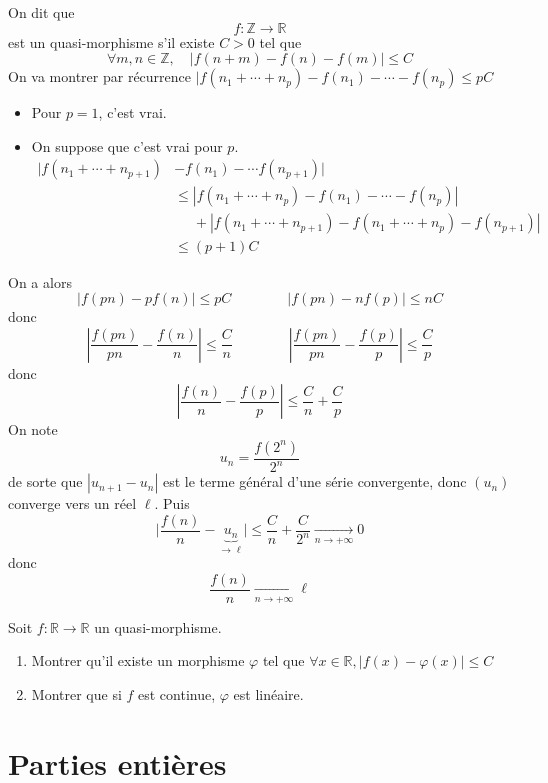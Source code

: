 \begin{ex}
    On dit que \[
        f:\mathbb Z\longrightarrow\mathbb R
    \]
    est un quasi-morphisme s'il existe $C>0$ tel que \[
        \forall m,n\in\mathbb Z, \quad |f(n+m)-f(n)-f(m)|\leq C
    \]
    On va montrer par récurrence $|f(n_1+\cdots +n_p)-f(n_1)-\cdots -f(n_p)\leq pC$
    \begin{itemize}
        \item Pour $p=1$, c'est vrai.
        \item On suppose que c'est vrai pour $p$. \begin{align*}
                |f(n_1+\cdots +n_{p+1})&-f(n_1)-\cdots f(n_{p+1})|\\ &\leq |f(n_1+\cdots+n_{p})-f(n_1)-\cdots-f(n_p)|\\&\phantom{\leq }+|f(n_1+\cdots+n_{p+1})-f(n_1+\cdots +n_p)-f(n_{p+1})|\\&\leq (p+1)C
            \end{align*}
    \end{itemize}
    On a alors \[
        |f(pn)-pf(n)|\leq pC\qquad \qquad |f(pn)-nf(p)|\leq nC
    \]
    donc \[
        \left| \frac{f(pn)}{pn}-\frac{f(n)}n \right|\leq \frac Cn\qquad \qquad \left| \frac{f(pn)}{pn}-\frac{f(p)}p \right|\leq \frac Cp
    \]
    donc \[
        \left| \frac{f(n)}n-\frac{f(p)}p \right|\leq \frac Cn+\frac Cp
    \]
    On note \[
        u_n=\frac{f(2^n)}{2^n}
    \]
    de sorte que $|u_{n+1}-u_n|$ est le terme général d'une série convergente, donc $(u_n)$ converge vers un réel $\ell$. Puis \[
        \Big| \frac{f(n)}n-\underbrace{u_n}_{\longrightarrow \ell} \Big|\leq \frac Cn+\frac C{2^n}\xrightarrow[n\to+\infty]{}0
    \]
    donc \[
        \frac {f(n)}n\xrightarrow[n\to+\infty]{}\ell
    \]
\end{ex}

\begin{exo}
    Soit $f:\mathbb R\longrightarrow \mathbb R$ un quasi-morphisme. \begin{enumerate}
        \item Montrer qu'il existe un morphisme $\varphi$ tel que $\forall x\in\mathbb R, |f(x)-\varphi(x)|\leq C$
        \item Montrer que si $f$ est continue, $\varphi$ est linéaire.
    \end{enumerate}
\end{exo}

\section{Parties entières}

